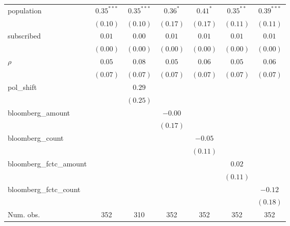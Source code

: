 \begin{table}[!h]
\begin{center}
\begin{tabular}{l c c c c c c }
population              & $0.35^{***}$ & $0.35^{***}$  & $0.36^{*}$   & $0.41^{*}$   & $0.35^{**}$  & $0.39^{***}$ \\
                        & $(0.10)$     & $(0.10)$      & $(0.17)$     & $(0.17)$     & $(0.11)$     & $(0.11)$     \\
subscribed              & $0.01$       & $0.00$        & $0.01$       & $0.01$       & $0.01$       & $0.01$       \\
                        & $(0.00)$     & $(0.00)$      & $(0.00)$     & $(0.00)$     & $(0.00)$     & $(0.00)$     \\
$\rho$                  & $0.05$       & $0.08$        & $0.05$       & $0.06$       & $0.05$       & $0.06$       \\
                        & $(0.07)$     & $(0.07)$      & $(0.07)$     & $(0.07)$     & $(0.07)$     & $(0.07)$     \\
pol\_shift              &              & $0.29$        &              &              &              &              \\
                        &              & $(0.25)$      &              &              &              &              \\
bloomberg\_amount       &              &               & $-0.00$      &              &              &              \\
                        &              &               & $(0.17)$     &              &              &              \\
bloomberg\_count        &              &               &              & $-0.05$      &              &              \\
                        &              &               &              & $(0.11)$     &              &              \\
bloomberg\_fctc\_amount &              &               &              &              & $0.02$       &              \\
                        &              &               &              &              & $(0.11)$     &              \\
bloomberg\_fctc\_count  &              &               &              &              &              & $-0.12$      \\
                        &              &               &              &              &              & $(0.18)$     \\
\midrule
Num. obs.               & 352          & 310           & 352          & 352          & 352          & 352          \\

\end{tabular}
\end{center}
\end{table}
